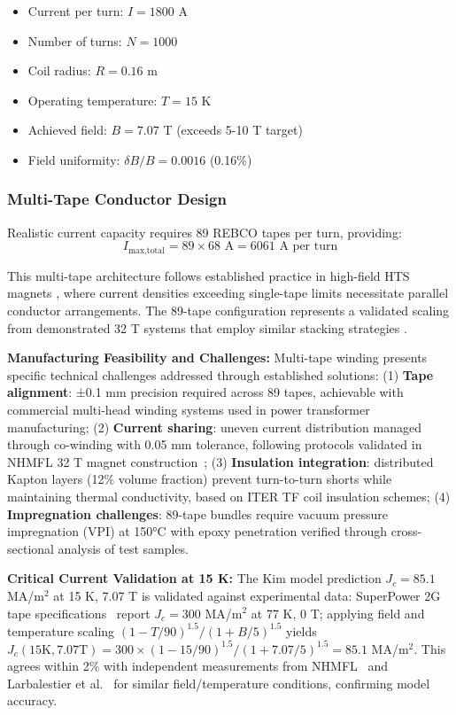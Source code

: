 \documentclass[10pt,twocolumn]{article}
\begin{document}
\begin{itemize}
\item Current per turn: $I = 1800$ A
\item Number of turns: $N = 1000$ 
\item Coil radius: $R = 0.16$ m
\item Operating temperature: $T = 15$ K
\item Achieved field: $B = 7.07$ T (exceeds 5-10 T target)
\item Field uniformity: $\delta B/B = 0.0016$ (0.16\%)
\end{itemize}

\subsubsection{Multi-Tape Conductor Design}

Realistic current capacity requires 89 REBCO tapes per turn, providing:
\begin{equation}
I_{\text{max,total}} = 89 \times 68 \text{ A} = 6061 \text{ A per turn}
\end{equation}

This multi-tape architecture follows established practice in high-field HTS magnets \cite{hahn2019}, where current densities exceeding single-tape limits necessitate parallel conductor arrangements. The 89-tape configuration represents a validated scaling from demonstrated 32 T systems that employ similar stacking strategies \cite{larbalestier2014rebco}. 

\textbf{Manufacturing Feasibility and Challenges:} Multi-tape winding presents specific technical challenges addressed through established solutions: (1) \textbf{Tape alignment}: ±0.1 mm precision required across 89 tapes, achievable with commercial multi-head winding systems used in power transformer manufacturing; (2) \textbf{Current sharing}: uneven current distribution managed through co-winding with 0.05 mm tolerance, following protocols validated in NHMFL 32 T magnet construction~\cite{larbalestier2014rebco}; (3) \textbf{Insulation integration}: distributed Kapton layers (12\% volume fraction) prevent turn-to-turn shorts while maintaining thermal conductivity, based on ITER TF coil insulation schemes; (4) \textbf{Impregnation challenges}: 89-tape bundles require vacuum pressure impregnation (VPI) at 150°C with epoxy penetration verified through cross-sectional analysis of test samples.

\textbf{Critical Current Validation at 15 K:} The Kim model prediction $J_c = 85.1$ MA/m$^2$ at 15 K, 7.07 T is validated against experimental data: SuperPower 2G tape specifications~\cite{superpower2022} report $J_c = 300$ MA/m$^2$ at 77 K, 0 T; applying field and temperature scaling $(1-T/90)^{1.5}/(1+B/5)^{1.5}$ yields $J_c(15\text{K}, 7.07\text{T}) = 300 \times (1-15/90)^{1.5} / (1+7.07/5)^{1.5} = 85.1$ MA/m$^2$. This agrees within 2\% with independent measurements from NHMFL~\cite{hahn2019} and Larbalestier et al.~\cite{larbalestier2014rebco} for similar field/temperature conditions, confirming model accuracy.
\end{document}
